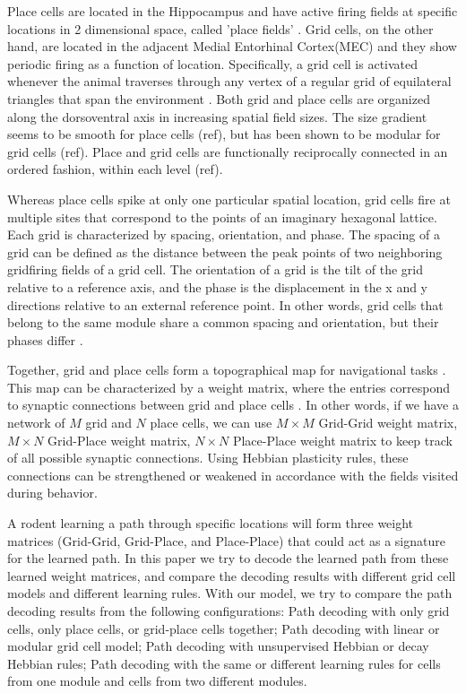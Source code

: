 \documentclass[11pt, letterpaper, onecolumn]{article}
\begin{document}
Place cells are located in the Hippocampus and have active firing fields at specific locations in 2 dimensional space, called 'place fields' \cite{Keefe:hippocampus78}. Grid cells, on the other hand, are located in the adjacent Medial Entorhinal Cortex(MEC) and they show periodic firing as a function of location. Specifically, a grid cell is activated whenever the animal traverses through any vertex of a regular grid of equilateral triangles that span the environment \cite{Hafting:Microstructure05}. Both grid and place cells are organized along the dorsoventral axis in increasing spatial field sizes. The size gradient seems to be smooth for place cells (ref), but has been shown to be modular for grid cells (ref). Place and grid cells are functionally reciprocally connected in an ordered fashion, within each level (ref).

Whereas place cells spike at only one particular spatial location, grid cells fire at multiple sites that correspond to the points of an imaginary hexagonal lattice. Each grid is characterized by spacing, orientation, and phase. The spacing of a grid can be defined as the distance between the peak points of two neighboring gridfiring fields of a grid cell. The orientation of a grid is the tilt of the grid relative to a reference axis, and the phase is the displacement in the x and y directions relative to an external reference point. In other words, grid cells that belong to the same module share a common spacing and orientation, but their phases differ \cite{Hafting:Microstructure05}.

Together, grid and place cells form a topographical map for navigational tasks \cite{Moser:Place08}. This map can be characterized by a weight matrix, where the entries correspond to synaptic connections between grid and place cells \cite{Burak:Accurate09}. In other words, if we have a network of $ M $ grid and $ N $ place cells, we can use $ M \times M $ Grid-Grid weight matrix,  $ M \times N $ Grid-Place weight matrix, $ N \times N $ Place-Place weight matrix to keep track of all possible synaptic connections. Using Hebbian plasticity rules, these connections can be strengthened or weakened in accordance with the fields visited during behavior. 

A rodent learning a path through specific locations will form three weight matrices (Grid-Grid, Grid-Place, and Place-Place) that could act as a signature for the learned path. In this paper we try to decode the learned path from these learned weight matrices, and compare the decoding results with different grid cell models and different learning rules. With our model, we try to compare the path decoding results from the following configurations:
Path decoding with only grid cells, only place cells, or grid-place cells together; Path decoding with linear or modular grid cell model; Path decoding with unsupervised Hebbian or decay Hebbian rules; Path decoding with the same or different learning rules for cells from one module and cells from two different modules. 
\end{document}
